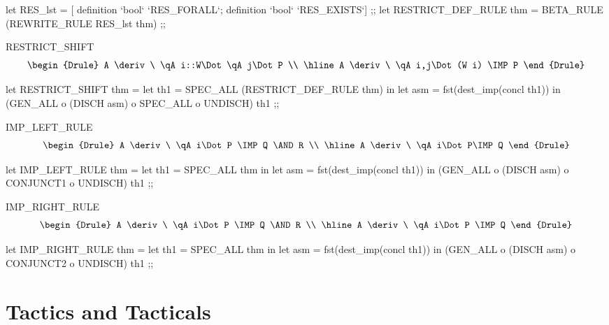 \enddocs
{}
\endmoddef
let RES_lst = 
    [ definition `bool` `RES_FORALL`; definition `bool` `RES_EXISTS`] ;;
let RESTRICT_DEF_RULE thm = BETA_RULE (REWRITE_RULE RES_lst thm) ;;
\endcode
{}


\begin{RULE}{RESTRICT\_SHIFT} \\
\[ \begin{Drule}
   A \deriv\ \qA i::W\Dot \qA j\Dot P  \\ \hline
   A \deriv\ \qA i,j\Dot (W i) \IMP  P
\end{Drule}\]
\end{RULE}

\enddocs
{}
\endmoddef
let RESTRICT_SHIFT thm =
    let th1 = SPEC_ALL (RESTRICT_DEF_RULE thm) in
    let asm = fst(dest_imp(concl th1)) in
    (GEN_ALL o (DISCH asm) o SPEC_ALL o UNDISCH) th1 ;;
\endcode
{}


\begin{RULE}{IMP\_LEFT\_RULE} \\
\[ \begin{Drule}
   A \deriv\ \qA i\Dot P \IMP Q \AND R  \\ \hline
   A \deriv\ \qA i\Dot P\IMP Q
\end{Drule} \]
\end{RULE}

\enddocs
{}
\endmoddef
let IMP_LEFT_RULE thm =
    let th1 = SPEC_ALL thm in
    let asm = fst(dest_imp(concl th1)) in
    (GEN_ALL o (DISCH asm) o CONJUNCT1 o UNDISCH) th1 ;;
\endcode
{}


\begin{RULE}{IMP\_RIGHT\_RULE} \\
\[ \begin{Drule}
   A \deriv\ \qA i\Dot P \IMP Q \AND R  \\ \hline
   A \deriv\ \qA i\Dot P \IMP Q
\end{Drule}\]
\end{RULE}

\enddocs
{}
\endmoddef
let IMP_RIGHT_RULE thm =
    let th1 = SPEC_ALL thm in
    let asm = fst(dest_imp(concl th1)) in
    (GEN_ALL o (DISCH asm) o CONJUNCT2 o UNDISCH) th1 ;;
\endcode
{}



\section{Tactics and Tacticals}


